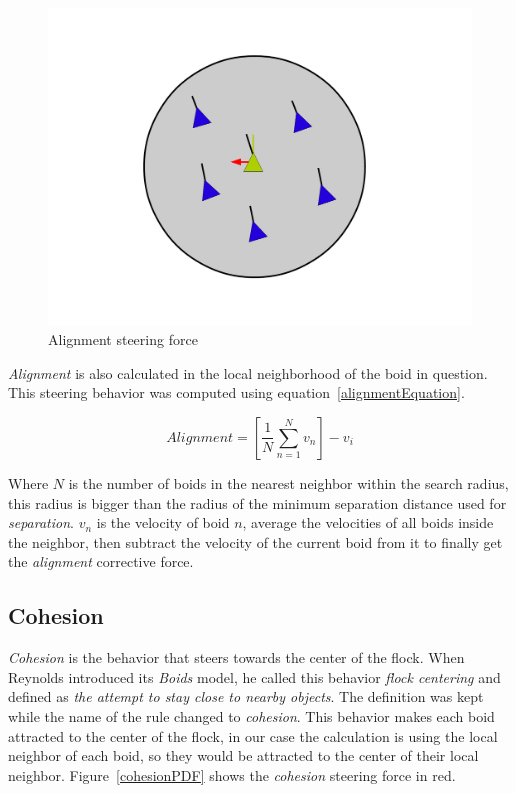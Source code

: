 \begin{figure}[htbp]
\begin{center}
\includegraphics[scale=0.3]{figures/alignment.pdf}
\caption{Alignment steering force}
\label{alignmentPDF}
\end{center}
\end{figure}

\textit{Alignment} is also calculated in the local neighborhood of the boid in question. This steering behavior was computed using equation~\ref{alignmentEquation}.

\begin{equation}
\label{alignmentEquation}
Alignment = \left[  \frac{1}{N} \sum_{n=1}^{N} v_n \right ] - v_i
\end{equation}

Where $N$ is the number of boids in the nearest neighbor within the search radius, this radius is bigger than the radius of the minimum separation distance used for \textit{separation}. $v_n$ is the velocity of boid $n$, average the velocities of all boids inside the neighbor, then subtract the velocity of the current boid from it to finally get the \textit{alignment} corrective force.

\subsection{Cohesion}
\textit{Cohesion} is the behavior that steers towards the center of the flock. When Reynolds introduced its \textit{Boids} model, he called this behavior \textit{flock centering} and defined as \textit{the attempt to stay close to nearby objects}. The definition was kept while the name of the rule changed to \textit{cohesion}. This behavior makes each boid attracted to the center of the flock, in our case the calculation is using the local neighbor of each boid, so they would be attracted to the center of their local neighbor.  Figure~\ref{cohesionPDF} shows the \textit{cohesion} steering force in red.

